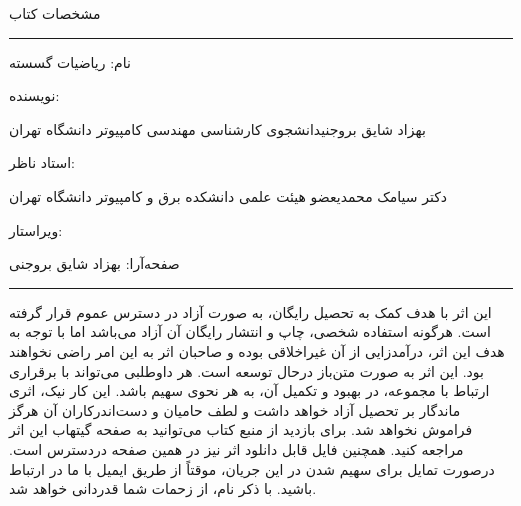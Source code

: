 \newpage
\thispagestyle{empty}
\begin{center}
    مشخصات کتاب
\end{center}

\rule{\textwidth}{0.5pt}

\scriptsize{

نام: ریاضیات گسسته

نویسنده:
\begin{AFFILIATIONS}
    \AFFILIATIONROW
    {بهزاد شایق بروجنی}{دانشجوی کارشناسی مهندسی کامپیوتر دانشگاه تهران}{}
    {}{}{}
    {}{}{}
\end{AFFILIATIONS}

استاد ناظر:
\begin{AFFILIATIONS}
    \AFFILIATIONROW
    {دکتر سیامک محمدی}{عضو هیئت علمی دانشکده برق و کامپیوتر دانشگاه تهران}{}
    {}{}{}
    {}{}{}
\end{AFFILIATIONS}

ویراستار:

صفحه‌آرا:
بهزاد شایق بروجنی

}

\rule{\textwidth}{0.5pt}

\scriptsize{
\p
این اثر با هدف کمک به تحصیل رایگان، به صورت آزاد در دسترس عموم قرار گرفته است.
هرگونه استفاده شخصی، چاپ و انتشار رایگان آن آزاد می‌باشد اما
با توجه به هدف این اثر، درآمدزایی از آن غیراخلاقی بوده و صاحبان اثر
به این امر راضی نخواهند بود.
\p
این اثر به صورت متن‌باز درحال توسعه است. هر داوطلبی می‌تواند
با برقراری ارتباط با مجموعه، در بهبود و تکمیل آن، به هر نحوی سهیم باشد.
این کار نیک، اثری ماندگار بر تحصیل آزاد خواهد داشت و لطف
حامیان و دست‌اندرکاران آن هرگز فراموش نخواهد شد.
\p
برای بازدید از منبع کتاب می‌توانید به صفحه
گیتهاب
این اثر مراجعه کنید.
همچنین فایل قابل دانلود اثر نیز در
همین صفحه
دردسترس است.
درصورت تمایل برای سهیم شدن در این جریان،
موقتاً از طریق
ایمیل
با ما در ارتباط باشید.
با ذکر نام، از زحمات شما قدردانی خواهد شد.
}
